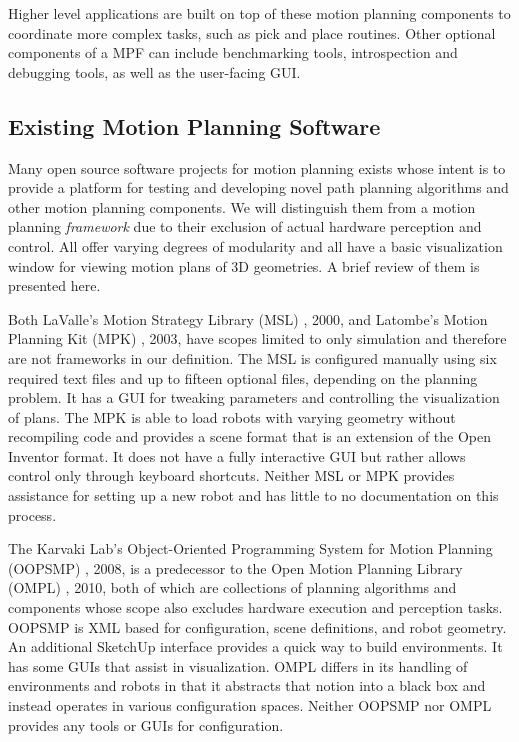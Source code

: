 \documentclass[10pt,journal,compsoc]{joser1}
\begin{document}
{Higher level applications are built on top of these motion planning components
to coordinate more complex tasks, such as pick and place routines. Other
optional components of a MPF can include benchmarking tools, introspection and
debugging tools, as well as the user-facing GUI.

\subsection{Existing Motion Planning Software}
\label{sec::existing}

Many open source software projects for motion planning exists whose intent is to
provide a platform for testing and developing novel path planning algorithms and
other motion planning components. We will distinguish them from a motion
planning \textit{framework} due to their exclusion of actual hardware perception
and control. All offer varying degrees of modularity and all have a basic
visualization window for viewing motion plans of 3D geometries. A brief review
of them is presented here.

Both LaValle's Motion Strategy Library (MSL) \cite{lavallemsl}, 2000, and
Latombe's Motion Planning Kit (MPK) \cite{mpk}, 2003, have scopes limited to
only simulation and therefore are not frameworks in our definition. The MSL is
configured manually using six required text files and up to fifteen optional
files, depending on the planning problem. It has a GUI for tweaking parameters
and controlling the visualization of plans. The MPK is able to load robots with
varying geometry without recompiling code and provides a scene format that is an
extension of the Open Inventor format. It does not have a fully interactive GUI but
rather allows control only through keyboard shortcuts. Neither MSL or MPK
provides assistance for setting up a new robot and has little to no
documentation on this process.

The Karvaki Lab's Object-Oriented Programming System for Motion Planning
(OOPSMP) \cite{oopsmp}, 2008, is a predecessor to the Open Motion Planning
Library (OMPL) \cite{sucan2012the-open-motion-planning-library}, 2010, both of
which are collections of planning algorithms and components whose scope also
excludes hardware execution and perception tasks. OOPSMP is XML based for
configuration, scene definitions, and robot geometry. An additional SketchUp
interface provides a quick way to build environments. It has some GUIs that
assist in visualization. OMPL differs in its handling of environments and robots
in that it abstracts that notion into a black box and instead operates in
various configuration spaces. Neither OOPSMP nor OMPL provides any tools or GUIs
for configuration.

}
\end{document}

